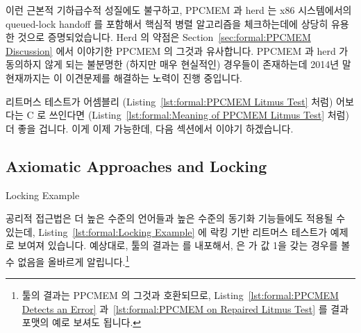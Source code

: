 이런 근본적 기하급수적 성질에도 불구하고, PPCMEM 과 herd 는 x86 시스템에서의
queued-lock handoff 를 포함해서 핵심적 병렬 알고리즘을 체크하는데에 상당히
유용한 것으로 증명되었습니다.
Herd 의 약점은
Section~\ref{sec:formal:PPCMEM Discussion} 에서 이야기한 PPCMEM 의 그것과
유사합니다.
PPCMEM 과 herd 가 동의하지 않게 되는 불분명한 (하지만 매우 현실적인) 경우들이
존재하는데 2014년 말 현재까지는 이 이견문제를 해결하는 노력이 진행 중입니다.
\iffalse

Despite their exponential nature, both PPCMEM and herd have proven quite
useful for checking key parallel algorithms, including the queued-lock
handoff on x86 systems.
The weaknesses of the herd tool are similar to those of PPCMEM, which
were described in
Section~\ref{sec:formal:PPCMEM Discussion}.
There are some obscure (but very real) cases for which the PPCMEM and
herd tools disagree, and as of late 2014 resolving these disagreements
was ongoing.
\fi

리트머스 테스트가 어셈블리
(Listing~\ref{lst:formal:PPCMEM Litmus Test} 처럼) 어보다는 C 로 쓰인다면
(Listing~\ref{lst:formal:Meaning of PPCMEM Litmus Test} 처럼) 더 좋을 겁니다.
이게 이제 가능한데, 다음 섹션에서 이야기 하겠습니다.
\iffalse

It would be helpful if the litmus tests could be written in C
(as in Listing~\ref{lst:formal:Meaning of PPCMEM Litmus Test})
rather than assembly
(as in Listing~\ref{lst:formal:PPCMEM Litmus Test}).
This is now possible, as will be described in the following sections.
\fi

\subsection{Axiomatic Approaches and Locking}
\label{sec:formal:Axiomatic Approaches and Locking}

\begin{listing}[tb]

\caption{Locking Example}
\label{lst:formal:Locking Example}
\end{listing}

공리적 접근법은 더 높은 수준의 언어들과 높은 수준의 동기화 기능들에도 적용될 수
있는데, Listing~\ref{lst:formal:Locking Example} 에 락킹 기반 리트머스 테스트가
예제로 보여져 있습니다.
예상대로,  툴의 결과는  를 내포해서,  은  가
값 1을 갖는 경우를 볼 수 없음을 올바르게 알립니다.\footnote{
	 툴의 결과는 PPCMEM 의 그것과 호환되므로,
	Listing~\ref{lst:formal:PPCMEM Detects an Error}
	과~\ref{lst:formal:PPCMEM on Repaired Litmus Test} 를 결과 포맷의 예로
	보셔도 됩니다.}
\iffalse

